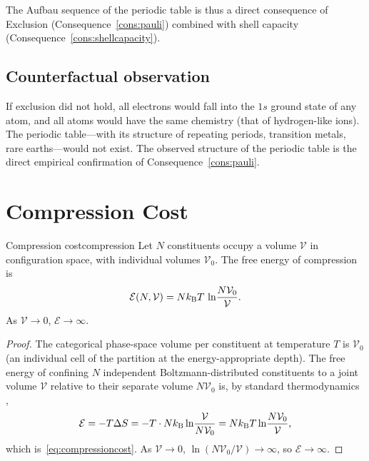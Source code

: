 The Aufbau sequence of the periodic table is thus a direct consequence of Exclusion (Consequence~\ref{cons:pauli}) combined with shell capacity (Consequence~\ref{cons:shellcapacity}).

\subsection{Counterfactual observation}

If exclusion did not hold, all electrons would fall into the $1s$ ground state of any atom, and all atoms would have the same chemistry (that of hydrogen-like ions). The periodic table---with its structure of repeating periods, transition metals, rare earths---would not exist. The observed structure of the periodic table is the direct empirical confirmation of Consequence~\ref{cons:pauli}.

\section{Compression Cost}
\label{sec:compression}

\begin{consequence}{Compression cost}{compression}
Let $N$ constituents occupy a volume $\mathcal{V}$ in configuration space, with individual volumes $\mathcal{V}_{0}$. The free energy of compression is
\begin{equation}
\mathcal{E}(N,\mathcal{V})=Nk_{\mathrm{B}} T\,\ln\!\frac{N\mathcal{V}_{0}}{\mathcal{V}}.
\label{eq:compressioncost}
\end{equation}
As $\mathcal{V}\to 0$, $\mathcal{E}\to\infty$.
\end{consequence}

\begin{proof}
The categorical phase-space volume per constituent at temperature $T$ is $\mathcal{V}_{0}$ (an individual cell of the partition at the energy-appropriate depth). The free energy of confining $N$ independent Boltzmann-distributed constituents to a joint volume $\mathcal{V}$ relative to their separate volume $N\mathcal{V}_{0}$ is, by standard thermodynamics \citep{landaulifshitz5},
\begin{equation*}
\mathcal{E}=-T\Delta S=-T\cdot Nk_{\mathrm{B}}\ln\!\frac{\mathcal{V}}{N\mathcal{V}_{0}}=Nk_{\mathrm{B}} T\ln\!\frac{N\mathcal{V}_{0}}{\mathcal{V}},
\end{equation*}
which is~\eqref{eq:compressioncost}. As $\mathcal{V}\to 0$, $\ln(N\mathcal{V}_{0}/\mathcal{V})\to\infty$, so $\mathcal{E}\to\infty$.
\end{proof}

